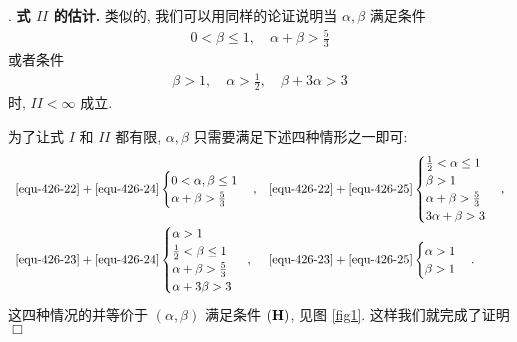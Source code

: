 \documentclass[master]{cugthesis}
\newenvironment{proof}{{\noindent\itshape 证明}.}{\hfill $\Box$\par}
\begin{document}
\begin{proof}
{\bf 式 $II$ 的估计.} 类似的, 我们可以用同样的论证说明当 $\alpha,\beta$ 满足条件
\begin{align} \label{equ-426-24}
0<\beta\leq 1, \quad \alpha+\beta>\frac{5}{3}
\end{align}
或者条件
\begin{align} \label{equ-426-25}
\beta>1, \quad \alpha>\frac{1}{2}, \quad \beta+3\alpha>3
\end{align}
时, $II<\infty$ 成立.



 为了让式 $I$ 和 $II$ 都有限, $\alpha,\beta$ 只需要满足下述四种情形之一即可:
 \begin{equation*}
 \begin{array}{ll}
\eqref{equ-426-22}+\eqref{equ-426-24}
 \begin{cases}
  0< \alpha,\beta\le 1  \\
  \alpha+\beta>\frac{5}{3}
 \end{cases},
 &
 \eqref{equ-426-22}+\eqref{equ-426-25}
 \begin{cases}
  \frac{1}{2}<\alpha\leq 1\\
  \beta>1 \\
  \alpha+\beta>\frac{5}{3}\\
  3\alpha+\beta>3
  \end{cases},\\

 \eqref{equ-426-23}+\eqref{equ-426-24}
 \begin{cases}
  \alpha>1\\
  \frac{1}{2}<\beta\leq 1 \\
  \alpha+\beta>\frac{5}{3}\\
  \alpha+3\beta>3
 \end{cases},
 &
 \eqref{equ-426-23}+\eqref{equ-426-25}
 \begin{cases}
  \alpha>1 \\
  \beta>1
 \end{cases}.
 \end{array}
\end{equation*}
这四种情况的并等价于 $(\alpha,\beta)$ 满足条件 $({\bf H})$, 见图 \ref{fig1}. 这样我们就完成了证明 \end{proof}
\end{document}

